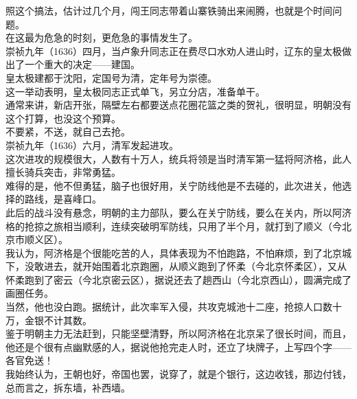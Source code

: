 \begin{multicols}{\theparacolNo}
照这个搞法，估计过几个月，闯王同志带着山寨铁骑出来闹腾，也就是个时间问题。\\

在这最为危急的时刻，更危急的事情发生了。\\

崇祯九年（1636）四月，当卢象升同志正在费尽口水劝人进山时，辽东的皇太极做出了一个重大的决定——建国。\\

皇太极建都于沈阳，定国号为清，定年号为崇德。\\

这一举动表明，皇太极同志正式单飞，另立分店，准备单干。\\

通常来讲，新店开张，隔壁左右都要送点花圈花篮之类的贺礼，很明显，明朝没有这个打算，也没这个预算。\\

不要紧，不送，就自己去抢。\\

崇祯九年（1636）六月，清军发起进攻。\\

这次进攻的规模很大，人数有十万人，统兵将领是当时清军第一猛将阿济格，此人擅长骑兵突击，非常勇猛。\\

难得的是，他不但勇猛，脑子也很好用，关宁防线他是不去碰的，此次进关，他选择的路线，是喜峰口。\\

此后的战斗没有悬念，明朝的主力部队，要么在关宁防线，要么在关内，所以阿济格的抢掠之旅相当顺利，连续突破明军防线，只用了半个月，就打到了顺义（今北京市顺义区）。\\

我认为，阿济格是个很能吃苦的人，具体表现为不怕跑路，不怕麻烦，到了北京城下，没敢进去，就开始围着北京跑圈，从顺义跑到了怀柔（今北京怀柔区），又从怀柔跑到了密云（今北京密云区），据说还去了趟西山（今北京西山），圆满完成了画圈任务。\\

当然，他也没白跑。据统计，此次率军入侵，共攻克城池十二座，抢掠人口数十万，金银不计其数。\\

鉴于明朝主力无法赶到，只能坚壁清野，所以阿济格在北京呆了很长时间，而且，他还是个很有点幽默感的人，据说他抢完走人时，还立了块牌子，上写四个字——各官免送！\\

我始终认为，王朝也好，帝国也罢，说穿了，就是个银行，这边收钱，那边付钱，总而言之，拆东墙，补西墙。\\


\end{multicols}
